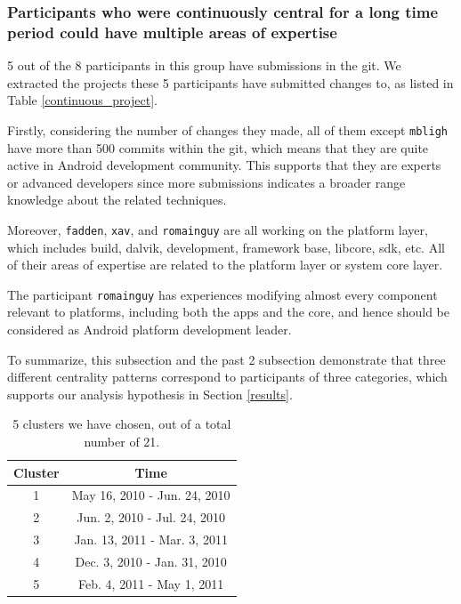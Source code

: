 \documentclass[conference]{IEEEtran}
\begin{document}

\subsubsection{Participants who were continuously central for a long time period could have multiple areas of expertise}

5 out of the 8 participants in this group have submissions in the
git.
We extracted the projects these 5 participants have submitted changes
to, as listed in Table \ref{continuous_project}.


Firstly, considering the number of changes they made, all of them
except \texttt{mbligh} have more than 500 commits within the
git,
which means that they are quite active in Android
development community. This supports that they are
experts or advanced developers since more submissions indicates a
 broader range knowledge about the related techniques.


Moreover, \texttt{fadden}, \texttt{xav}, and \texttt{romainguy} are
all working on the platform layer,
which includes build, dalvik, development, framework base, libcore,
sdk, etc. All of their areas of expertise are related to the platform layer or
system core layer.

The participant \texttt{romainguy} has experiences modifying almost every
component relevant to platforms, including both the apps and the core, and
hence should be considered as Android platform development leader.


To summarize, this subsection and the past 2 subsection demonstrate
that three different centrality patterns correspond to
participants of three categories, which supports our analysis hypothesis
in Section \ref{results}.


\begin{table}[!t]
\centering
\caption{5 clusters we have chosen, out of a total number of 21.}
\begin{tabular}{|c|c|}
\hline
Cluster & Time  \\
\hline
1 & May 16, 2010 - Jun. 24, 2010 \\
\hline
2 & Jun. 2, 2010 - Jul. 24, 2010  \\
\hline
3 & Jan. 13, 2011 - Mar. 3, 2011 \\
\hline
4 & Dec. 3, 2010 - Jan. 31, 2010 \\
\hline
5 & Feb. 4, 2011 - May 1, 2011 \\
\hline
\end{tabular}
\label{cluster_list}
\end{table}
\end{document}
